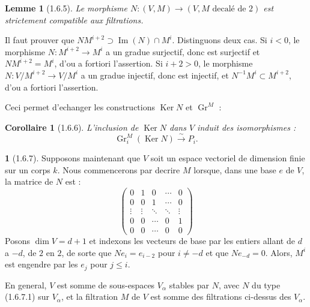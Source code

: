 \documentclass[12pt,a4paper]{article}
\theoremstyle{plain}
\newtheorem{lemme}[theorem]{Lemme}
\newtheorem{corollaire}[theorem]{Corollaire}
\theoremstyle{definition}
\theoremstyle{definition}
\newtheorem{para}{}[section]
\theoremstyle{remark}
\DeclareMathOperator{\Gr}{Gr}
\DeclareMathOperator{\Imm}{Im}
\DeclareMathOperator{\Ker}{Ker}
\begin{document}
\begin{lemme}[1.6.5]
Le morphisme $N: (V, M) \to (V, M \text{ decal\'e de } 2)$ est strictement compatible aux filtrations.
\end{lemme}

Il faut prouver que $NM^{i+2} \supset \Imm(N) \cap M^i$. Distinguons deux cas. Si $i < 0$, le morphisme $N: M^{i+2} \to M^i$ a un gradue surjectif, donc est surjectif et $NM^{i+2} = M^i$, d'ou a fortiori l'assertion. Si $i + 2 > 0$, le morphisme $N: V/M^{i+2} \to V/M^i$ a un gradue injectif, donc est injectif, et $N^{-1} M^i \subset M^{i+2}$, d'ou a fortiori l'assertion.

Ceci permet d'echanger les constructions $\Ker N$ et $\Gr^M$ :

\begin{corollaire}[1.6.6]
L'inclusion de $\Ker N$ dans $V$ induit des isomorphismes :
\[\Gr_i^M(\Ker N) \xrightarrow{\sim} P_i.\]
\end{corollaire}

\begin{para}[1.6.7]
Supposons maintenant que $V$ soit un espace vectoriel de dimension finie sur un corps $k$. Nous commencerons par decrire $M$ lorsque, dans une base $e$ de $V$, la matrice de $N$ est :
\begin{equation}\tag{1.6.7.1}
\begin{pmatrix}
0 & 1 & 0 & \cdots & 0 \\
0 & 0 & 1 & \cdots & 0 \\
\vdots & \vdots & \ddots & \ddots & \vdots \\
0 & 0 & \cdots & 0 & 1 \\
0 & 0 & \cdots & 0 & 0
\end{pmatrix}
\end{equation}
Posons $\dim V = d+1$ et indexons les vecteurs de base par les entiers allant de $d$ a $-d$, de $2$ en $2$, de sorte que $Ne_i = e_{i-2}$ pour $i \neq -d$ et que $Ne_{-d} = 0$. Alors, $M^i$ est engendre par les $e_j$ pour $j \leq i$.

En general, $V$ est somme de sous-espaces $V_\alpha$ stables par $N$, avec $N$ du type (1.6.7.1) sur $V_\alpha$, et la filtration $M$ de $V$ est somme des filtrations ci-dessus des $V_\alpha$.
\end{para}
\end{document}
